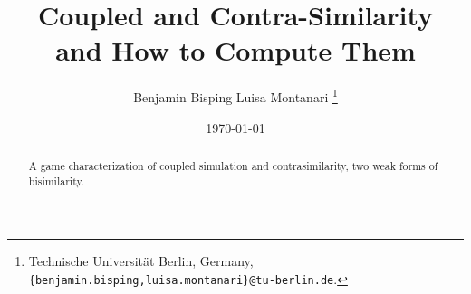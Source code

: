 \documentclass[10pt,a4paper]{article}
\title{ \textbf{Coupled and Contra-Similarity} \\ \Large and How to Compute Them }
\author{ Benjamin Bisping \qquad Luisa Montanari%
  \footnote{Technische Universit\"at Berlin, Germany,
    \texttt{\{benjamin.bisping,luisa.montanari\}@tu-berlin.de}.} }
\date{\today}
\begin{document}
\maketitle

\begin{abstract}
A game characterization of coupled simulation and contrasimilarity, two weak forms of bisimilarity.
\end{abstract}

\tableofcontents



%
%
\end{document}
